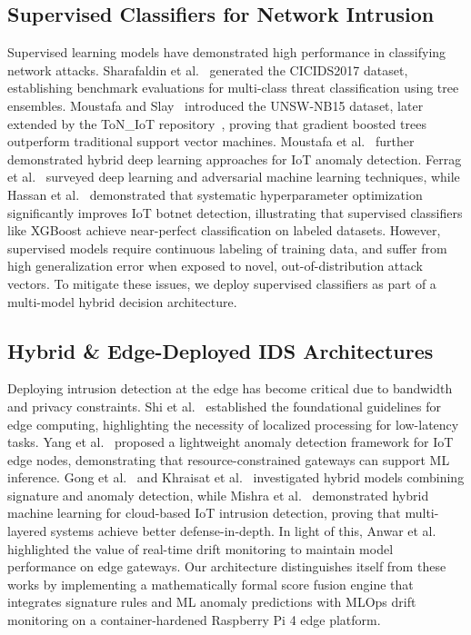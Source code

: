\documentclass[journal]{IEEEtran}
\begin{document}
\subsection{Supervised Classifiers for Network Intrusion}
Supervised learning models have demonstrated high performance in classifying network attacks. Sharafaldin et al.~\cite{sharafaldin2018toward} generated the CICIDS2017 dataset, establishing benchmark evaluations for multi-class threat classification using tree ensembles. Moustafa and Slay~\cite{moustafa2015unsw} introduced the UNSW-NB15 dataset, later extended by the ToN\_IoT repository~\cite{moustafa2020ton}, proving that gradient boosted trees outperform traditional support vector machines. Moustafa et al.~\cite{moustafa2018anomaly} further demonstrated hybrid deep learning approaches for IoT anomaly detection. Ferrag et al.~\cite{ferrag2020deep, ferrag2021adversarial} surveyed deep learning and adversarial machine learning techniques, while Hassan et al.~\cite{hassan2020hyperparameter} demonstrated that systematic hyperparameter optimization significantly improves IoT botnet detection, illustrating that supervised classifiers like XGBoost achieve near-perfect classification on labeled datasets. However, supervised models require continuous labeling of training data, and suffer from high generalization error when exposed to novel, out-of-distribution attack vectors. To mitigate these issues, we deploy supervised classifiers as part of a multi-model hybrid decision architecture.

\subsection{Hybrid & Edge-Deployed IDS Architectures}
Deploying intrusion detection at the edge has become critical due to bandwidth and privacy constraints. Shi et al.~\cite{shi2016edge} established the foundational guidelines for edge computing, highlighting the necessity of localized processing for low-latency tasks. Yang et al.~\cite{yang2022lightweight} proposed a lightweight anomaly detection framework for IoT edge nodes, demonstrating that resource-constrained gateways can support ML inference. Gong et al.~\cite{gong2021deep} and Khraisat et al.~\cite{khraisat2019survey} investigated hybrid models combining signature and anomaly detection, while Mishra et al.~\cite{mishra2021intrusion} demonstrated hybrid machine learning for cloud-based IoT intrusion detection, proving that multi-layered systems achieve better defense-in-depth. In light of this, Anwar et al.~\cite{anwar2024realtime} highlighted the value of real-time drift monitoring to maintain model performance on edge gateways. Our architecture distinguishes itself from these works by implementing a mathematically formal score fusion engine that integrates signature rules and ML anomaly predictions with MLOps drift monitoring on a container-hardened Raspberry Pi 4 edge platform.
\end{document}
